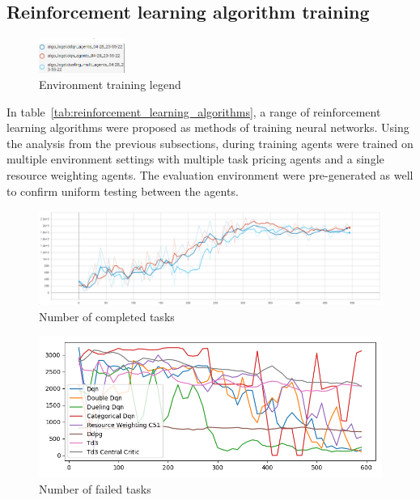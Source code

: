 \subsection{Reinforcement learning algorithm training}\label{subsec:reinforcement-learning-algorithm-training}
\begin{figure}
    \includegraphics[width=0.25\textwidth]{figures/5_evaluation_figs/algo_training_fig/legend.PNG}
    \caption{Environment training legend}
    \label{fig:algo-training-legend}
\end{figure}

In table~\ref{tab:reinforcement_learning_algorithms}, a range of reinforcement learning algorithms were proposed as
methods of training neural networks. Using the analysis from the previous subsections, during training agents were
trained on multiple environment settings with multiple task pricing agents and a single resource weighting agents.
The evaluation environment were pre-generated as well to confirm uniform testing between the agents. \\

\begin{figure}[H]
    \centering
    \includegraphics[width=\linewidth]{figures/5_evaluation_figs/algo_training_fig/num_completed_tasks.PNG}
    \caption{Number of completed tasks}
    \label{fig:algo_num_completed_tasks}
\end{figure}

\begin{figure}[H]
    \centering
    \includegraphics[width=\linewidth]{figures/5_evaluation_figs/algo_training_fig/num_failed_tasks.png}
    \caption{Number of failed tasks}
    \label{fig:algo_num_failed_tasks}
\end{figure}

